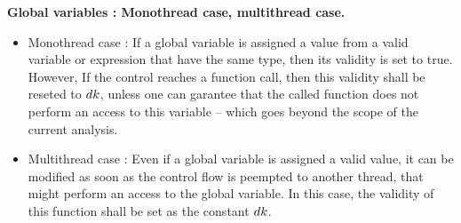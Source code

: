 \textbf{Global variables : Monothread case, multithread case.}
\begin{itemize}
\item Monothread case : If a global variable is assigned a value
from a valid variable or expression that have the same type, then
its validity is set to true. However, If the control reaches a 
function call, then this validity shall be reseted to $dk$, unless
one can garantee that the called function does not perform an access
to this variable -- which goes beyond the scope of the current analysis. 

\item Multithread case : Even if a global variable is assigned a valid
value, it can be modified as soon as the control flow is peempted to another
thread, that might perform an access to the global variable. In this case,
the validity of this  function shall be set as the constant $dk$.
\end{itemize}
